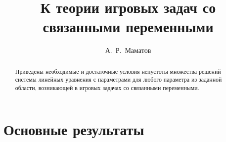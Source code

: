 

\usepackage[russian]{nla}

%
%


%




%
\fi

\title{К теории игровых задач со связанными переменными}
\author{А.~Р.~Маматов} %


\maketitle

\begin{abstract}
Приведены необходимые и достаточные условия непустоты множества решений системы линейных уравнения с параметрами для любого параметра из заданной области,  возникающей в игровых задачах со связанными переменными.
\end{abstract}

\section{Основные результаты} %

